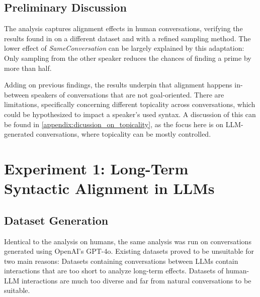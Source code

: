 \documentclass[11pt]{article}
\begin{document}
\subsection{Preliminary Discussion}
The analysis captures alignment effects in human conversations, verifying the results found in \citealp{reitter2008context} on a different dataset and with a refined sampling method.
The lower effect of \textit{SameConversation} can be largely explained by this adaptation: Only sampling from the other speaker reduces the chances of finding a prime by more than half. 

Adding on previous findings, the results underpin that alignment happens in-between speakers of conversations that are not goal-oriented. There are limitations, specifically concerning different topicality across conversations, which could be hypothesized to impact a speaker's used syntax. A discussion of this can be found in \ref{appendix:dicussion_on_topicality}, as the focus here is on LLM-generated conversations, where topicality can be mostly controlled.

\section{Experiment 1: Long-Term Syntactic Alignment in LLMs}\label{sec:experiment1}

\subsection{Dataset Generation}
Identical to the analysis on humans, the same analysis was run on conversations generated using OpenAI's GPT-4o. Existing datasets proved to be unsuitable for two main reasons: Datasets containing conversations between LLMs contain interactions that are too short to analyze long-term effects. Datasets of human-LLM interactions are much too diverse and far from natural conversations to be suitable.
\end{document}
